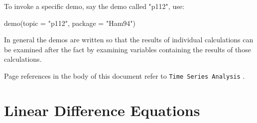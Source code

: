 \documentclass[a4paper]{article}
\newcommand{\TSA}{\texttt{Time Series Analysis} }
\begin{document}
To invoke a specific demo, say the demo called "p112", use:
\begin{Schunk}
\begin{Sinput}
 demo(topic = "p112", package = "Ham94")
\end{Sinput}
\end{Schunk}

In general the demos are written so that the results of individual calculations can be examined
after the fact by examining variables containing the results of those calculations.

Page references in the body of this document refer to \TSA.
\pagebreak{}
\tableofcontents
\pagebreak{}
\section{Linear Difference Equations}
\end{document}
